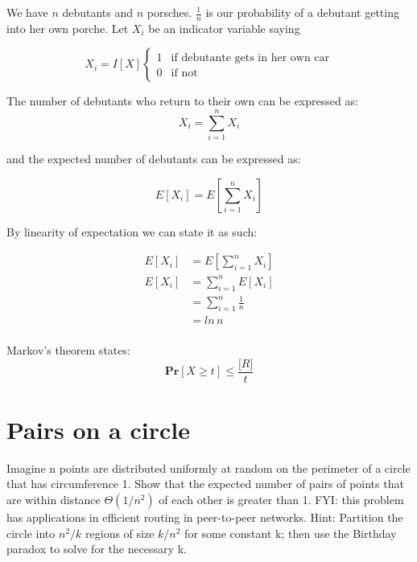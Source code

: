 \documentclass[titlepage]{article}\usepackage[]{graphicx}\usepackage[]{color}
\begin{document}
We have $n$ debutants and $n$ porsches. 
$\frac{1}{n}$ is our probability of a debutant getting into her own porche.
Let $X_i$ be an indicator variable saying 

\[
	X_i = I[X]
  \begin{cases}
   1 & \text{if debutante gets in her own car} \\
   0       & \text{if not } 
  \end{cases}
\]

The number of debutants who return to their own can be expressed as:
\[ X_i = \sum_{i=1}^n X_i \]

and the expected number of debutants can be expressed as:

\[ E [X_i] = E \left[ \sum_{i=1}^n X_i \right] \]

By linearity of expectation we can state it as such:

\begin{align*}
	E [X_i] &= E \left[ \sum_{i=1}^n X_i \right] \\
	E [X_i] &=  \sum_{i=1}^n E[X_i] \\ 
	&=  \sum_{i=1}^n \frac{1}{n} \\ 
	&=  ln\, n \\ 
\end{align*}


Markov's theorem states:
\[ \mathbf{Pr} \left[ X \geq t \right] \leq \frac{\mathbf[R]}{t} \]



  \section{ Pairs on a circle}
Imagine n points are distributed uniformly at random on the perimeter of a
circle that has circumference 1. Show that the expected number of pairs of
points that are within distance $\Theta(1/n^2)$ of each other is greater than 1. FYI:
this problem has applications in efficient routing in peer-to-peer networks.
Hint: Partition the circle into $n^2/k$ regions of size $k/n^2$ for some constant
k; then use the Birthday paradox to solve for the necessary k.

  
\end{document}
